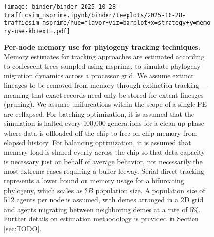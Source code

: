 \begin{figure}[h]
\centering
\begin{minipage}{0.62\linewidth}
    \centering
\texttt{[image: binder/binder-2025-10-28-trafficsim\_msprime.ipynb/binder/teeplots/2025-10-28-trafficsim\_msprime/hue=flavor+viz=barplot+x=strategy+y=memory-use-kb+ext=.pdf]}
\end{minipage}%
\begin{minipage}{0.38\linewidth}
\caption{%
\textbf{Per-node memory use for phylogeny tracking techniques.}
\footnotesize
Memory estimates for tracking approaches are estimated according to coalescent trees sampled using msprime, to simulate phylogeny migration dynamics across a processor grid.
We assume extinct lineages to be removed from memory through extinction tracking --- meaning that exact records need only be stored for extant lineages (pruning).
We assume unifurcations within the scope of a single PE are collapsed.
For batching optimization, it is assumed that the simulation is halted every 100,000 generations for a clean-up phase where data is offloaded off the chip to free on-chip memory from elapsed history.
For balancing optimization, it is assumed that memory load is shared evenly across the chip so that data capacity is necessary just on behalf of average behavior, not necessarily the most extreme cases requiring a buffer leeway.
Serial direct tracking represents a lower bound on memory usage for a bifurcating phylogeny, which scales as $2B$ population size.
A population size of 512 agents per node is assumed, with demes arranged in a 2D grid and agents migrating between neighboring demes at a rate of 5\%.
Further details on estimation methodology is provided in Section \ref{sec:TODO}.
}
\label{fig:msprime-memory-estimate}
\end{minipage}
\end{figure}
